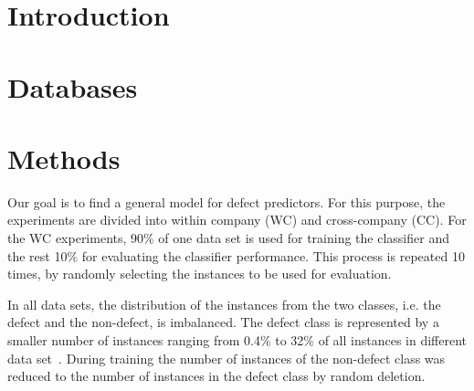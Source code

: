 \documentclass{sig-alternate}
\begin{document}
\maketitle
\begin{abstract}
\end {abstract}


\section{Introduction}
\section{Databases}


\section{Methods}
Our goal is to find a general model for defect predictors. For this purpose, the experiments are divided
into  within company (WC) and cross-company (CC). For the WC experiments, 90\% of one data set
is used for training the classifier and the rest 10\% for evaluating the classifier performance. This process
is repeated 10 times, by randomly selecting the instances to be used for evaluation.

In all data sets, the distribution of the instances from the two classes, i.e. the defect and the non-defect, is
imbalanced. The defect class is represented by a smaller number of instances ranging  from 0.4\% to 32\% of
all instances in different data set~\cite{Turhan2009}. During training the number of instances of the non-defect
class was reduced to the number of instances in the defect class by random deletion.
\end{document}
